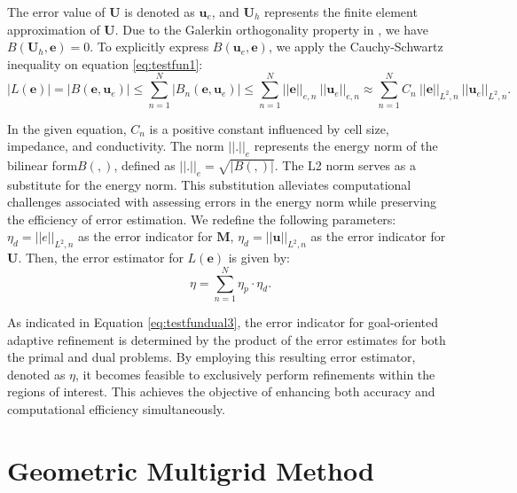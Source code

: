 \documentclass[extra, referee]{gji}
\begin{document}
The error value of $\mathbf{U}$ is denoted as $\mathbf{u}_e$, and $\mathbf{U}_h$
represents the finite element approximation of $\mathbf{U}$. Due to the Galerkin
orthogonality property in \citep{Brenner2008}, we have $ B(\mathbf{U}_h,
\mathbf{e}) = 0$. To explicitly express $B(\mathbf{u}_e, \mathbf{e})$, we apply
the Cauchy-Schwartz \citep{Oden2001,Brenner2008} inequality on equation
\ref{eq:testfun1}:
\begin{equation}
  \label{eq:testfundual2}
   \left| L(\mathbf{e}) \right| = \left| B(\mathbf{e}, \mathbf{u}_e) \right|
     \leq \sum_{n=1}^{N} \left| B_n(\mathbf{e}, \mathbf{u}_e) \right|
     \leq \sum_{n=1}^{N} ||\mathbf{e}||_{e, n} \ ||\mathbf{u}_e||_{e, n}
     \approx \sum_{n=1}^{N} C_n \ ||\mathbf{e}||_{L^2, n} \ ||\mathbf{u}_e||_{L^2, n}.
\end{equation}

In the given equation, $C_n$ is a positive constant influenced by cell size,
impedance, and conductivity. The norm $||.||_e$ represents the energy norm of
the bilinear form$ B(,)$, defined as $||.||_e = \sqrt{|B(,)|}$. The L2 norm
\citep{Zdunek2005} serves as a substitute for the energy norm. This substitution
alleviates computational challenges associated with assessing errors in the
energy norm while preserving the efficiency of error estimation. We redefine the
following parameters: $\eta_d = ||e||_{L^2,n}$ as the error indicator for
$\mathbf{M}$, $\eta_d = ||\mathbf{u}||_{L^2,n}$ as the error indicator for
$\mathbf{U}$. Then, the error estimator for $L(\mathbf{e})$ is given by:
\begin{equation}
  \label{eq:testfundual3}
   \eta = \sum_{n=1}^{N} \eta_p \cdot \eta_d.
\end{equation}

As indicated in Equation \ref{eq:testfundual3}, the error indicator for
goal-oriented adaptive refinement is determined by the product of the error
estimates for both the primal and dual problems. By employing this resulting
error estimator, denoted as $\eta$, it becomes feasible to exclusively perform
refinements within the regions of interest. This achieves the objective of
enhancing both accuracy and computational efficiency simultaneously.

\section{ Geometric Multigrid Method}
\end{document}

